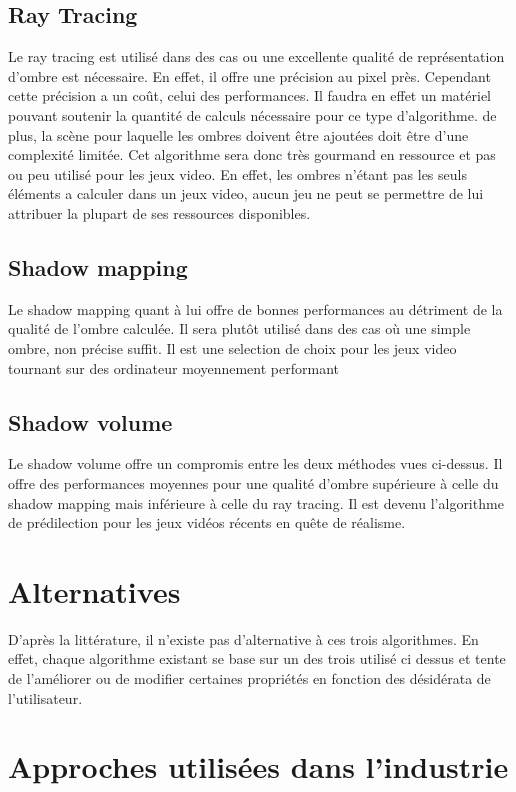 \documentclass[a4paper,12pt]{report}
\begin{document}
\subsection{Ray Tracing}
Le ray tracing est utilisé dans des cas ou une excellente qualité de représentation d'ombre est nécessaire. En effet, il offre une précision au pixel près. Cependant cette précision a un coût, celui des performances. Il faudra en effet un matériel pouvant soutenir la quantité de calculs nécessaire pour ce type d'algorithme. de plus, la scène pour laquelle les ombres doivent être ajoutées doit être d'une complexité limitée. Cet algorithme sera donc très gourmand en ressource et pas ou peu utilisé pour les jeux video. En effet, les ombres n'étant pas les seuls éléments a calculer dans un jeux video, aucun jeu ne peut se permettre de lui attribuer la plupart de ses ressources disponibles.
\subsection{Shadow mapping}
Le shadow mapping quant à lui offre de bonnes performances au détriment de la qualité de l'ombre calculée. Il sera plutôt utilisé dans des cas où une simple ombre, non précise suffit.
Il est une selection de choix pour les jeux video tournant sur des ordinateur moyennement performant
\subsection{Shadow volume}
Le shadow volume offre un compromis entre les deux méthodes vues ci-dessus. Il offre des performances moyennes pour une qualité d'ombre supérieure à celle du shadow mapping mais inférieure à celle du ray tracing. 
Il est devenu l'algorithme de prédilection pour les jeux vidéos récents en qu\^ete de réalisme.

\section{Alternatives}

D'après la littérature, il n'existe pas d'alternative à ces trois algorithmes. En effet, chaque algorithme existant se base sur un des trois utilisé ci dessus et tente de l'améliorer ou de modifier certaines propriétés en fonction des désidérata de l'utilisateur.

\section{Approches utilisées dans l'industrie}
\end{document}
